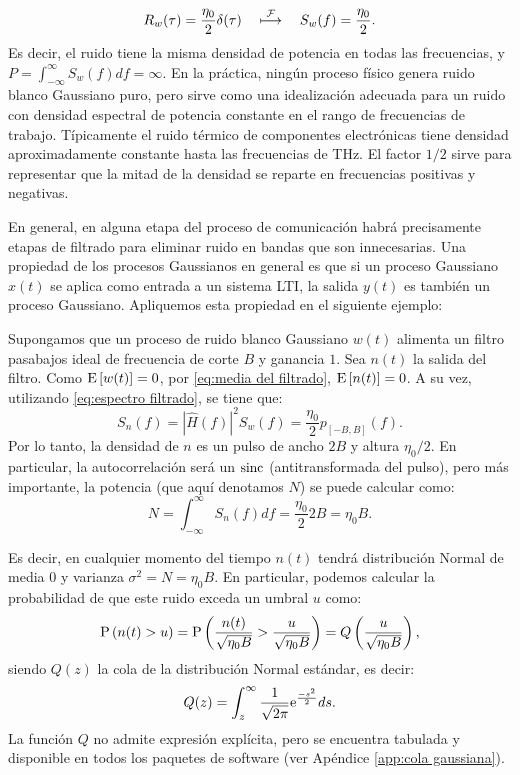 \begin{equation*}
    R_w(\tau) = \frac{\eta_0}{2}\delta(\tau) \quad \;\displaystyle{\mathop{\longmapsto}^{\mathcal{F}}}\; \quad S_w(f) = \frac{\eta_0}{2}.
\end{equation*}
Es decir, el ruido tiene la misma densidad de potencia en todas las frecuencias, y $P=\int_{-\infty}^\infty S_w(f)df = \infty$. En la práctica, ningún proceso físico genera ruido blanco Gaussiano puro, pero sirve como una idealización adecuada para un ruido con densidad espectral de potencia constante en el rango de frecuencias de trabajo. Típicamente el ruido térmico de componentes electrónicas tiene densidad aproximadamente constante hasta las frecuencias de \unit{\tera\hertz}. El factor $1/2$ sirve para representar que la mitad de la densidad se reparte en frecuencias positivas y negativas.

En general, en alguna etapa del proceso de comunicación habrá precisamente etapas de filtrado para eliminar ruido en bandas que son innecesarias. Una propiedad de los procesos Gaussianos en general es que si un proceso Gaussiano $x(t)$ se aplica como entrada a un sistema LTI, la salida $y(t)$ es también un proceso Gaussiano. Apliquemos esta propiedad en el siguiente ejemplo:

\begin{ejemplo}
    Supongamos que un proceso de ruido blanco Gaussiano $w(t)$ alimenta un filtro pasabajos ideal de frecuencia de corte $B$ y ganancia $1$. Sea $n(t)$ la salida del filtro. Como $\mathrm{E}\left[w(t)\right]=0$, por \eqref{eq:media del filtrado}, $\mathrm{E}\left[n(t)\right]=0$. A su vez, utilizando \eqref{eq:espectro filtrado}, se tiene que:
    \begin{equation*}
        S_n(f) = |\hat{H}(f)|^2 S_w(f) = \frac{\eta_0}{2}p_{[-B,B]}(f).
    \end{equation*}
    Por lo tanto, la densidad de $n$ es un pulso de ancho $2B$ y altura $\eta_0/2$. En particular, la autocorrelación será un $\operatorname{sinc}$ (antitransformada del pulso), pero más importante, la potencia (que aquí denotamos $N$) se puede calcular como:
    \begin{equation*}
        N = \int_{-\infty}^\infty S_n(f)df = \frac{\eta_0}{2}{2B} = \eta_0 B.
    \end{equation*}

    Es decir, en cualquier momento del tiempo $n(t)$ tendrá distribución Normal de media $0$ y varianza $\sigma^2 = N = \eta_0 B$. En particular, podemos calcular la probabilidad de que este ruido exceda un umbral $u$ como:
    \begin{equation}\label{eq:cola ruido pasabajos}
        \mathrm{P}\left(n(t)>u\right) = \mathrm{P}\left(\frac{n(t)}{\sqrt{\eta_0 B}} > \frac{u}{\sqrt{\eta_0 B}}\right) = Q\left(\frac{u}{\sqrt{\eta_0 B}}\right),
    \end{equation}
    siendo $Q(z)$ la cola de la distribución Normal estándar, es decir:
    \begin{equation}\label{eq:def cola gaussiana}
        Q(z) = \int_z^\infty \frac{1}{\sqrt{2\pi}} \mathrm{e}^{\frac{-s^2}{2}} ds.
    \end{equation}
    La función $Q$ no admite expresión explícita, pero se encuentra tabulada y disponible en todos los paquetes de software (ver Apéndice \ref{app:cola gaussiana}). 
\end{ejemplo}

